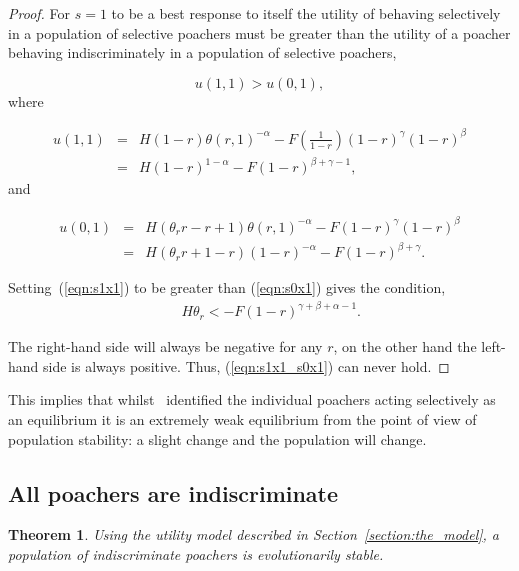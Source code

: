 \documentclass[10pt]{article}
\newtheorem{theorem}{Theorem}
\begin{document}
\begin{proof}
    For \(s=1\) to be a best response to itself the utility of behaving
    selectively in a population of selective poachers must be greater than the utility
    of a poacher behaving indiscriminately in a population of selective poachers,

    \begin{equation}
    u(1,1) > u(0,1),
    \end{equation}
    where
    
    \begin{eqnarray}
    \label{eqn:s1x1}
    u(1, 1) & = & H(1 -r)\theta(r, 1) ^ {- \alpha} - F (\frac{1}{1 - r})(1 - r)^{\gamma}(1 - r)^{\beta} \\
    & = & H(1 - r)^{1 - \alpha} - F(1 - r)^{\beta + \gamma - 1},
    \end{eqnarray}
    and 
    
    \begin{eqnarray}
    \label{eqn:s0x1}
    u(0,1) & = & H(\theta_r r - r + 1)\theta(r, 1) ^ {- \alpha} - F (1 - r)^{\gamma}(1 - r)^{\beta} \\
           & = & H(\theta_r r +1 - r)(1 - r)^{-\alpha} - F(1 - r)^{\beta + \gamma}.
    \end{eqnarray}

    \noindent Setting~(\ref{eqn:s1x1}) to be greater than (\ref{eqn:s0x1}) gives the
    condition,
    \begin{eqnarray}
    \label{eqn:s1x1_s0x1}
    &&H \theta_r< -F(1 - r)^{\gamma + \beta + \alpha - 1}.
    \end{eqnarray}

    The right-hand side  will always be negative
    for any \(r\), on the other hand the left-hand side is always positive.
    Thus, (\ref{eqn:s1x1_s0x1}) can never hold. 
\end{proof}

This implies that whilst~\cite{Lee} identified the individual poachers
acting selectively as an equilibrium it is an extremely weak equilibrium from
the point of view of population stability: a slight change and the population
will change.

\subsection{All poachers are indiscriminate}

\begin{theorem}\label{theorem:indiscriminate}
Using the utility model described in Section~\ref{section:the_model}, a population
of indiscriminate poachers is evolutionarily stable.
\end{theorem}
\end{document}
